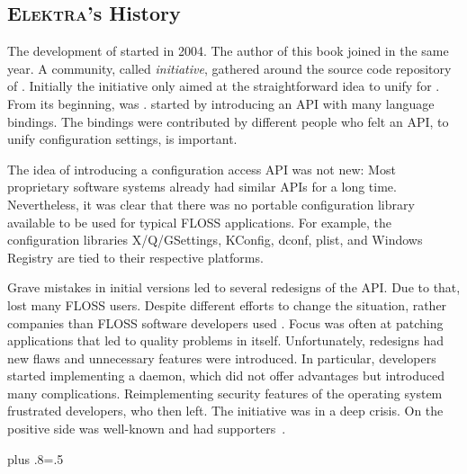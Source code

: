 \subsection{\textsc{Elektra}'s History}

The development of  started in 2004.
The author of this book joined in the same year.
A community, called \emph{\elektra{} initiative}, gathered around the source code repository of .
Initially the initiative only aimed at the straightforward idea to unify  for .
From its beginning, \elektra{} was .
 started by introducing an API with many language bindings.
The bindings were contributed by different people who felt an API, to unify configuration settings, is important.

The idea of introducing a configuration access API was not new:
Most proprietary software systems already had similar APIs for a long time.
Nevertheless, it was clear that there was no portable configuration library available to be used for typical FLOSS applications.
For example, the configuration libraries X/Q/GSettings, KConfig, dconf, plist, and Windows Registry are tied to their respective platforms.

Grave mistakes in initial versions led to several redesigns of the API.
Due to that, \elektra{} lost many FLOSS users.
Despite different efforts to change the situation, rather companies than FLOSS software developers used \elektra{}.
Focus was often at patching applications that led to quality problems in  itself.
Unfortunately, redesigns had new flaws and unnecessary features were introduced.
In particular, developers started implementing a daemon, which did not offer advantages but introduced many complications.
Reimplementing security features of the operating system frustrated developers, who then left.
The \elektra{} initiative was in a deep crisis.
On the positive side \elektra{} was well-known and had supporters~\cite{raab2017challenges}.%
{\parfillskip=0pt plus .8\textwidth \emergencystretch=.5\textwidth \par}

